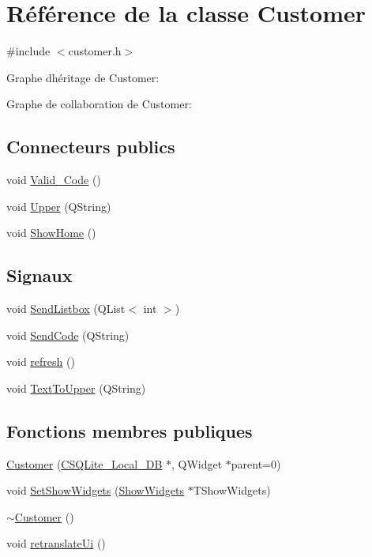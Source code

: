 \hypertarget{class_customer}{}\section{Référence de la classe Customer}
\label{class_customer}


{\ttfamily \#include $<$customer.\+h$>$}



Graphe d\textquotesingle{}héritage de Customer\+:


Graphe de collaboration de Customer\+:
\subsection*{Connecteurs publics}
\begin{DoxyCompactItemize}
\item 
void \hyperlink{class_customer_a0d0980ceceaa1b81051c5ef2ae17957c}{Valid\+\_\+\+Code} ()
\item 
void \hyperlink{class_customer_a66993f2e3dc76682760f245baf58e93b}{Upper} (Q\+String)
\item 
void \hyperlink{class_customer_af9f7fe11b87887bfb743427bf4dba41a}{Show\+Home} ()
\end{DoxyCompactItemize}
\subsection*{Signaux}
\begin{DoxyCompactItemize}
\item 
void \hyperlink{class_customer_ab181d91970028c93a12a70ee72e47bba}{Send\+Listbox} (Q\+List$<$ int $>$)
\item 
void \hyperlink{class_customer_affe548a8865a7bf020752759dd9e83b8}{Send\+Code} (Q\+String)
\item 
void \hyperlink{class_customer_aa77a1882ab68471152a1c7135f8ac95d}{refresh} ()
\item 
void \hyperlink{class_customer_a34c5d22deb1bb55552fa7cf025f087c6}{Text\+To\+Upper} (Q\+String)
\end{DoxyCompactItemize}
\subsection*{Fonctions membres publiques}
\begin{DoxyCompactItemize}
\item 
\hyperlink{class_customer_acac37f40f3e22b871d02e4f210b84926}{Customer} (\hyperlink{class_c_s_q_lite___local___d_b}{C\+S\+Q\+Lite\+\_\+\+Local\+\_\+\+D\+B} $\ast$, Q\+Widget $\ast$parent=0)
\item 
void \hyperlink{class_customer_a11ba6c36f51d6224947ff89ee507a050}{Set\+Show\+Widgets} (\hyperlink{class_show_widgets}{Show\+Widgets} $\ast$T\+Show\+Widgets)
\item 
\hyperlink{class_customer_ab93fb14683b0393b9c900109f77c2629}{$\sim$\+Customer} ()
\item 
void \hyperlink{class_customer_a1f20ee9bb6d82badc6b93fccf9aea28e}{retranslate\+Ui} ()
\end{DoxyCompactItemize}


